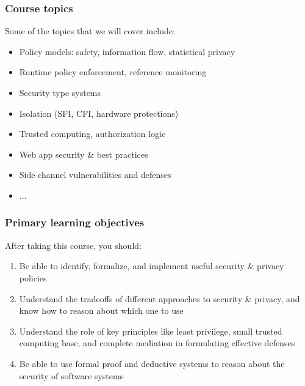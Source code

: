 \documentclass[10pt,handout]{beamer}
\begin{document}

\begin{frame}

\frametitle{Course topics}

Some of the topics that we will cover include:
\begin{itemize}
  \item Policy models: safety, information flow, statistical privacy
  \item Runtime policy enforcement, reference monitoring
  \item Security type systems
  \item Isolation (SFI, CFI, hardware protections)
  \item Trusted computing, authorization logic
  \item Web app security \& best practices
  \item Side channel vulnerabilities and defenses
  \item ...
\end{itemize}

\end{frame}


\begin{frame}

\frametitle{Primary learning objectives}

After taking this course, you should:
\begin{enumerate}
  \pause\item Be able to identify, formalize, and implement useful security \& privacy policies
  \pause\item Understand the tradeoffs of different approaches to security \& privacy, and know how to reason about which one to use
  \pause\item Understand the role of key principles like least privilege, small trusted computing base, and complete mediation in formulating effective defenses
  \pause\item Be able to use formal proof and deductive systems to reason about the security of software systems
\end{enumerate}

\end{frame}

\end{document}
